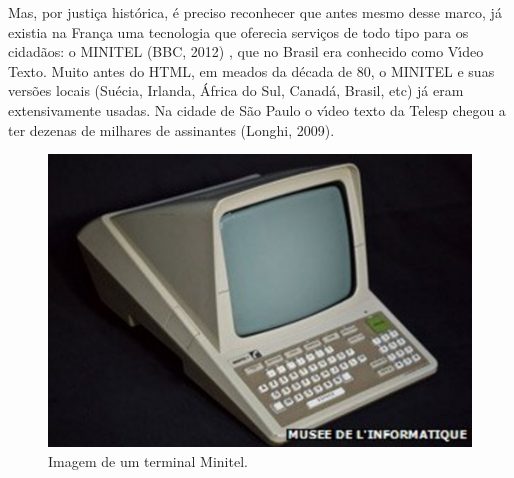 \documentclass[
12pt,		%
openright,	%
twoside,  %
a4paper,			%
chapter=TITLE,		%
english,			%
french,				%
spanish,			%
brazil				%
]{USPSC-classe/USPSC}
\begin{document}
Mas, por justi\c{c}a hist\'orica, \'e preciso reconhecer que antes mesmo desse marco, j\'a existia na Fran\c{c}a uma tecnologia que oferecia servi\c{c}os de todo tipo para os cidad\~aos: o MINITEL  (BBC, 2012) , que no Brasil era conhecido como V\'{\i}deo Texto. Muito antes do HTML, em meados da d\'ecada de 80, o MINITEL e suas vers\~oes locais (Su\'ecia, Irlanda, \'Africa do Sul, Canad\'a, Brasil, etc) j\'a eram extensivamente usadas. Na cidade de S\~ao Paulo o v\'{\i}deo texto da Telesp chegou a ter dezenas de milhares de assinantes  (Longhi, 2009).











\captionsetup{format=plain}
\begin{figure}[max size={\textwidth}{\textheight}]

\centering


\begin{minipage}[b]{0.4\linewidth}
        \centering
                \includegraphics[width=1.0\linewidth]{../../imagens/minitel.jpg}
                \caption{Imagem de um terminal Minitel.}
                \label{5d9a2782548e094108d5241aeff768916b33be6c}
\end{minipage}%
\hspace{0.5cm}
\end{figure}
\end{document}
